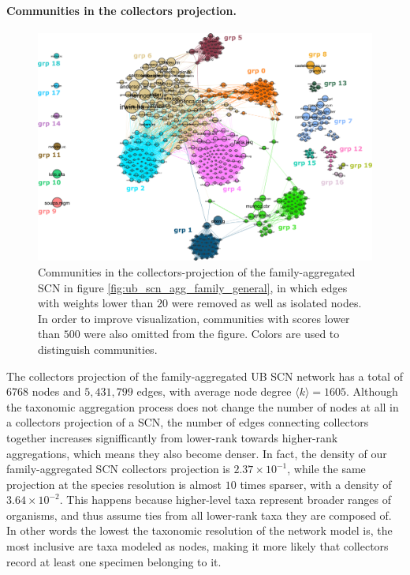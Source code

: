 \paragraph*{Communities in the collectors projection.}
\begin{figure}[!ht]
  	\centering
    \includegraphics[width=\linewidth]{figures/casestudy_ub/scn_family_projCol_communities.pdf}
    \caption{ Communities in the collectors-projection of the family-aggregated SCN in figure \ref{fig:ub_scn_agg_family_general}, in which edges with weights lower than $20$ were removed as well as isolated nodes. In order to improve visualization, communities with scores lower than $500$ were also omitted from the figure. Colors are used to distinguish communities.}
    \label{fig:ub_scn_family_projCol_communities}
\end{figure}
The collectors projection of the family-aggregated UB SCN network has a total of $6768$ nodes and $5,431,799$ edges, with average node degree $\langle k \rangle = 1605$.
Although the taxonomic aggregation process does not change the number of nodes at all in a collectors projection of a SCN, the number of edges connecting collectors together increases signifficantly from lower-rank towards higher-rank aggregations, which means they also become denser.
In fact, the density of our family-aggregated SCN collectors projection is $2.37 \times 10^{-1}$, while the same projection at the species resolution is almost $10$ times sparser, with a density of $3.64 \times 10^{-2}$. 
This happens because higher-level taxa represent broader ranges of organisms, and thus assume ties from all lower-rank taxa they are composed of.
In other words the lowest the taxonomic resolution of the network model is, the most inclusive are taxa modeled as nodes, making it more likely that collectors record at least one specimen belonging to it. 

